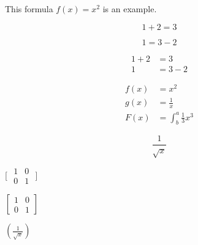 \documentclass[a4paper, 12pt]{article}
\begin{document}
This formula $f(x) = x^2$ is an example.

\begin{equation*}
    1 + 2 = 3
\end{equation*}

\begin{equation*}
    1 = 3 - 2
\end{equation*}

\begin{align*}
    1 + 2 &= 3 \\
    1 &= 3 - 2
\end{align*}

\begin{align*}
    f(x) & = x^2\\
    g(x) &= \frac{1}{x}\\
    F(x) &= \int^a_b \frac{1}{3}x^3
\end{align*}

\begin{equation*}
    \frac{1}{\sqrt{x}}
\end{equation*}

[
$\begin{matrix}  	%
    1 & 0\\
    0 & 1
\end{matrix}$  	%
]

$\left[				%
\begin{matrix}  
    1 & 0\\
    0 & 1
\end{matrix} 
\right]$  			%

$\left(\frac{1}{\sqrt{x}}\right)$
\end{document}
